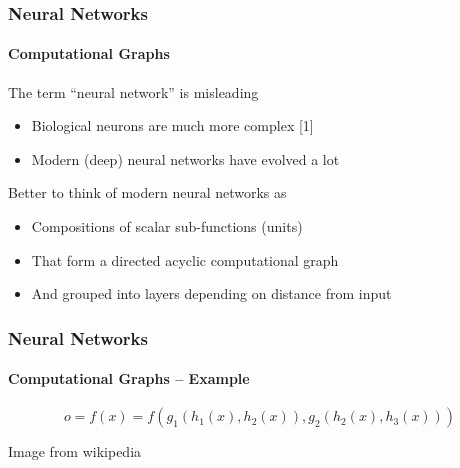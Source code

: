 \documentclass[xetex,professionalfont]{beamer}
\renewcommand\emph[1]{\textcolor{tuwcvl_cvl_blue}{#1}}
\begin{document}
\begin{frame}
\frametitle{Neural Networks}
\framesubtitle{Computational Graphs}

The term \enquote{neural network} is misleading
\begin{itemize}
    \item Biological neurons are much more complex [1]
    \item Modern (deep) neural networks have evolved a lot
\end{itemize}

\bigskip

Better to think of modern neural networks as
\begin{itemize}
    \item Compositions of scalar sub-functions (\emph{units})
    \item That form a directed acyclic computational graph
    \item And grouped into layers depending on distance from input
\end{itemize}

\end{frame}


\begin{frame}
\frametitle{Neural Networks}
\framesubtitle{Computational Graphs -- Example}


\[
    o=f(x)=f(g_1(h_1(x), h_2(x)), g_2(h_2(x), h_3(x)))
\]

\bigskip

\begin{center}
    {\centering Image from wikipedia}
\end{center}

\end{frame}
\end{document}
